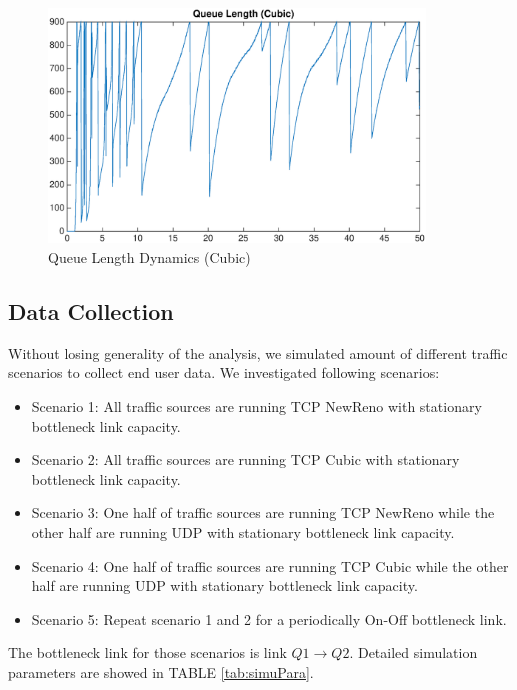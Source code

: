 \begin{figure}
\centering
\includegraphics[width=10cm]{QueueLengthCubic.eps}
\caption{Queue Length Dynamics (Cubic)}
\label{queuelengthCubic}
\end{figure}


\subsection{Data Collection}
Without losing generality of the analysis, we simulated amount of different traffic scenarios to collect end user data. We investigated following scenarios: 
\begin{itemize}
    \item Scenario 1: All traffic sources are running TCP NewReno with stationary bottleneck link capacity.
    \item Scenario 2: All traffic sources are running TCP Cubic with stationary bottleneck link capacity.
    \item Scenario 3: One half of traffic sources are running TCP NewReno while the other half are running UDP with stationary bottleneck link capacity.
    \item Scenario 4: One half of traffic sources are running TCP Cubic while the other half are running UDP with stationary bottleneck link capacity.
    \item Scenario 5: Repeat scenario 1 and 2 for a periodically On-Off bottleneck link.
\end{itemize}
The bottleneck link for those scenarios is link $Q1 \to Q2$. Detailed simulation parameters are showed in TABLE \ref{tab:simuPara}.

